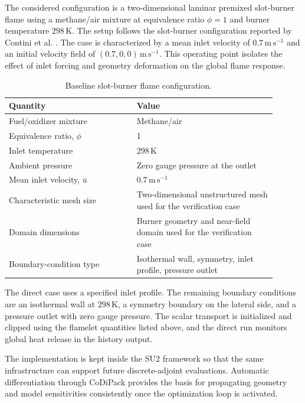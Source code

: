 \documentclass{iopconfser}
\begin{document}
The considered configuration is a two-dimensional laminar premixed slot-burner flame using a methane/air mixture at equivalence ratio $\phi=1$ and burner temperature $298\,\mathrm{K}$. The setup follows the slot-burner configuration reported by Contini et al. \cite{contini2020slotburner}. The case is characterized by a mean inlet velocity of $0.7\,\mathrm{m\,s^{-1}}$ and an initial velocity field of $(0.7,0,0)\,\mathrm{m\,s^{-1}}$. This operating point isolates the effect of inlet forcing and geometry deformation on the global flame response.

\begin{table}[!htbp]
  \centering
  \caption{Baseline slot-burner flame configuration.}
  \label{tab:baseline-conditions}
  \begin{tabular}{@{}p{0.43\linewidth}p{0.47\linewidth}@{}}
    \toprule
    Quantity & Value \\
    \midrule
    Fuel/oxidizer mixture & Methane/air \\
    Equivalence ratio, $\phi$ & 1 \\
    Inlet temperature & $298\,\mathrm{K}$ \\
    Ambient pressure & Zero gauge pressure at the outlet \\
    Mean inlet velocity, $\bar{u}$ & $0.7\,\mathrm{m\,s^{-1}}$ \\
    Characteristic mesh size & Two-dimensional unstructured mesh used for the verification case \\
    Domain dimensions & Burner geometry and near-field domain used for the verification case \\
    Boundary-condition type & Isothermal wall, symmetry, inlet profile, pressure outlet \\
    \bottomrule
  \end{tabular}
\end{table}

The direct case uses a specified inlet profile. The remaining boundary conditions are an isothermal wall at $298\,\mathrm{K}$, a symmetry boundary on the lateral side, and a pressure outlet with zero gauge pressure. The scalar transport is initialized and clipped using the flamelet quantities listed above, and the direct run monitors global heat release in the history output.

The implementation is kept inside the SU2 framework so that the same infrastructure can support future discrete-adjoint evaluations. Automatic differentiation through CoDiPack provides the basis for propagating geometry and model sensitivities consistently once the optimization loop is activated.
\end{document}
